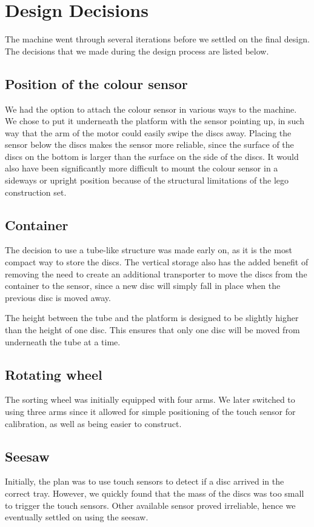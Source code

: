 \documentclass[a4paper,oneside,11pt]{article}
\begin{document}
\newpage

\section{Design Decisions}
The machine went through several iterations before we settled on the final design. The decisions that we made during the design process are listed below.

\subsection{Position of the colour sensor}
We had the option to attach the colour sensor in various ways to the machine. We chose to put it underneath the platform with the sensor pointing up, in such way that the arm of the motor could easily swipe the discs away.  Placing the sensor below the discs makes the sensor more reliable, since the surface of the discs on the bottom is larger than the surface on the side of the discs. It would also have been significantly more difficult to mount the colour sensor in a sideways or upright position because of the structural limitations of the lego construction set.

\subsection{Container}
The decision to use a tube-like structure was made early on, as it is the most compact way to store the discs. The vertical storage also has the added benefit of removing the need to create an additional transporter to move the discs from the container to the sensor, since a new disc will simply fall in place when the previous disc is moved away.

The height between the tube and the platform is designed to be slightly higher than the height of one disc. This ensures that only one disc will be moved from underneath the tube at a time.

\subsection{Rotating wheel}
The sorting wheel was initially equipped with four arms. We later switched to using three arms since it allowed for simple positioning of the touch sensor for calibration, as well as being easier to construct.
 
\subsection{Seesaw}
Initially, the plan was to use touch sensors to detect if a disc arrived in the correct tray. However, we quickly found that the mass of the discs was too small to trigger the touch sensors. Other available sensor proved irreliable, hence we eventually settled on using the seesaw.
\end{document}
